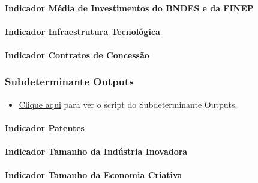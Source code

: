 \documentclass[
  12,
  dvipsnames]{article}
\providecommand{\tightlist}{%
  \setlength{\itemsep}{0pt}\setlength{\parskip}{0pt}}
\begin{document}
\hypertarget{indicador-muxe9dia-de-investimentos-do-bndes-e-da-finep}{%
\paragraph{Indicador Média de Investimentos do BNDES e da
FINEP}\label{indicador-muxe9dia-de-investimentos-do-bndes-e-da-finep}}

\hypertarget{indicador-infraestrutura-tecnoluxf3gica}{%
\paragraph{Indicador Infraestrutura
Tecnológica}\label{indicador-infraestrutura-tecnoluxf3gica}}

\hypertarget{indicador-contratos-de-concessuxe3o}{%
\paragraph{Indicador Contratos de
Concessão}\label{indicador-contratos-de-concessuxe3o}}

\hypertarget{subdet_output}{%
\subsubsection{Subdeterminante Outputs}\label{subdet_output}}

\begin{itemize}
\tightlist
\item
  \protect\hyperlink{script_2.5.2}{Clique aqui} para ver o script do
  Subdeterminante Outputs.
\end{itemize}

\hypertarget{indicador-patentes}{%
\paragraph{Indicador Patentes}\label{indicador-patentes}}

\hypertarget{indicador-tamanho-da-induxfastria-inovadora}{%
\paragraph{Indicador Tamanho da Indústria
Inovadora}\label{indicador-tamanho-da-induxfastria-inovadora}}

\hypertarget{indicador-tamanho-da-economia-criativa}{%
\paragraph{Indicador Tamanho da Economia
Criativa}\label{indicador-tamanho-da-economia-criativa}}
\end{document}
